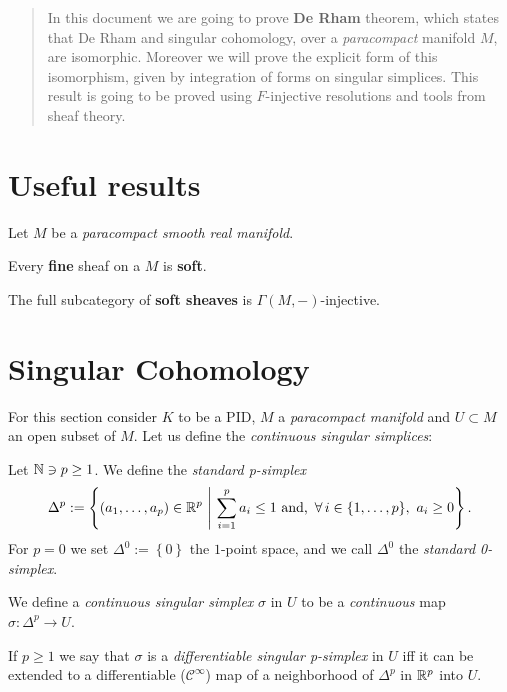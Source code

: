 \begin{abstract}
	In this document we are going to prove \textbf{De Rham} theorem,
	which states that De Rham and singular cohomology,
	over a \textit{paracompact} manifold $M$, are isomorphic.
	Moreover we will prove the explicit form of this isomorphism,
	given by integration of forms on singular simplices.
	This result is going to be proved using $F$-injective resolutions and tools from sheaf theory.
\end{abstract} 

\section{Useful results}
Let $M$ be a \textit{paracompact smooth real manifold}.
\begin{lem}
	Every \textbf{fine} sheaf on a $M$ is \textbf{soft}.
\end{lem} 
\begin{lem}\label{lem:gammainjectives}
	The full subcategory of \textbf{soft sheaves} is $\Gamma(M,-)$-injective.
\end{lem} 

\section{Singular Cohomology}
For this section consider $K$ to be a PID, $M$ a \textit{paracompact manifold} and $U \subset M$ an open subset of $M$.
Let us define the \textit{continuous singular simplices}:

\begin{defn}
	Let $\mathbb{N} \ni p \geq 1$. We define the \textit{standard p-simplex}
	\begin{equation}
		\Delta^p := \left\{ \left( a_1, \ldots, a_p \right) \in \R^p \ \middle|\ \sum_{i=1}^{p} a_i \leq 1 \text{ and, } \,\forall\, i \in \{1, \ldots, p \},\ a_i \geq 0  \right\}
	.\end{equation} 
	For $p = 0$ we set $\Delta^0 := \left\{ 0 \right\}$ the $1$-point space, and we call $\Delta^0$ the \textit{standard 0-simplex}.
\end{defn}

\begin{defn}
	We define a \textit{continuous singular simplex} $\sigma$ in $U$ to be a \textit{continuous} map $\sigma: \Delta^p \to U$.

	If $p \geq 1$ we say that $\sigma$ is a \textit{differentiable singular p-simplex} in $U$ iff it can be extended to a differentiable ($\mathscr{C}^\infty$) map of a neighborhood of $\Delta^p$ in $\mathbb{R}^p$ into $U$.
\end{defn}

